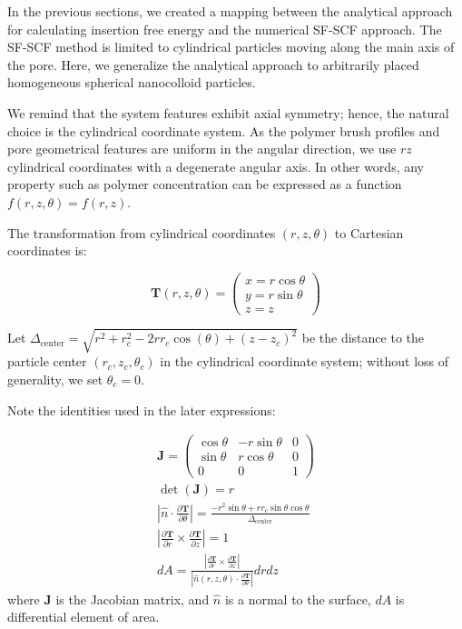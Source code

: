 \documentclass[10pt, a4paper]{article}
\begin{document}
\begin{multicols}{2}

In the previous sections, we created a mapping between the analytical approach for calculating insertion free energy and the numerical SF-SCF approach.
The SF-SCF method is limited to cylindrical particles moving along the main axis of the pore.
Here, we generalize the analytical approach to arbitrarily placed homogeneous spherical nanocolloid particles.

We remind that the system features exhibit axial symmetry; hence, the natural choice is the cylindrical coordinate system.
As the polymer brush profiles and pore geometrical features are uniform in the angular direction, we use $rz$ cylindrical coordinates with a degenerate angular axis.
In other words, any property such as polymer concentration can be expressed as a function $f(r, z, \theta) = f(r, z)$.

The transformation from cylindrical coordinates $(r, z, \theta)$ to Cartesian coordinates is:

\begin{equation}
    \bm{T}(r, z, \theta) = 
    \begin{pmatrix}
        x = r \cos \theta\\
        y = r \sin \theta\\
        z = z
    \end{pmatrix}
\end{equation}

Let $\Delta_{\textrm{center}} = \sqrt{r^2 + r_c^2 - 2 r r_c \cos(\theta) + (z - z_c)^2}$ be the distance to the particle center $(r_c, z_c, \theta_c)$ in the cylindrical coordinate system; without loss of generality, we set $\theta_c = 0$.

Note the identities used in the later expressions:

\begin{gather}
    \bm{J} = 
    \begin{pmatrix}
        \cos{\theta} & -r\sin\theta & 0 \\
        \sin{\theta} &  r\cos\theta & 0 \\
        0           & 0            & 1
    \end{pmatrix}\\
    \det(\bm{J}) = r \\
    \left| \hat{n} \cdot \frac{\partial \bm{T}}{\partial \theta} \right| = \frac{-r^2 \sin \theta + r r_c \sin \theta \cos \theta}{\Delta_{\textrm{center}}}\\
    \left| \frac{\partial \bm{T}}{\partial r} \times \frac{\partial \bm{T}}{\partial z} \right| = 1\\
    dA = \frac{\left|\frac{\partial \bm{T}}{\partial r} \times \frac{\partial \bm{T}}{\partial z} \right|}{\left|\hat{n}(r, z, \theta) \cdot \frac{\partial\bm{T}}{\partial \theta}\right|} dr dz
\end{gather}
where $\bm{J}$ is the Jacobian matrix, and $\hat{n}$ is a normal to the surface, $dA$ is differential element of area.


\end{multicols}
\end{document}
